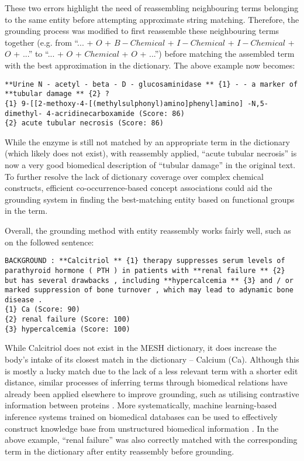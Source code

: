\documentclass[10pt, oneside]{article}
\begin{document}
These two errors highlight the need of reassembling neighbouring terms belonging to the same entity before attempting approximate string matching. Therefore, the grounding process was modified to first reassemble these neighbouring terms together (e.g. from ``... + $O$ + $B-Chemical$ + $I-Chemical$ + $I-Chemical$ +  $O$ + ...'' to ``... + $O$ + $Chemical$ +  $O$ + ...'') before matching the assembled term with the best approximation in the dictionary. The above example now becomes:

\begin{lstlisting}[breaklines]
**Urine N - acetyl - beta - D - glucosaminidase ** {1} - - a marker of **tubular damage ** {2} ? 
{1} 9-[[2-methoxy-4-[(methylsulphonyl)amino]phenyl]amino] -N,5-dimethyl- 4-acridinecarboxamide (Score: 86)
{2} acute tubular necrosis (Score: 86)
\end{lstlisting}

While the enzyme is still not matched by an appropriate term in the dictionary (which likely does not exist), with reassembly applied, ``acute tubular necrosis'' is now a very good biomedical description of ``tubular damage'' in the original text. To further resolve the lack of dictionary coverage over complex chemical constructs, efficient co-occurrence-based concept associations \cite{tsuruoka2008facta} could aid the grounding system in finding the best-matching entity based on functional groups in the term. 

Overall, the grounding method with entity reassembly works fairly well, such as on the followed sentence:

\begin{lstlisting}[breaklines]
BACKGROUND : **Calcitriol ** {1} therapy suppresses serum levels of parathyroid hormone ( PTH ) in patients with **renal failure ** {2} but has several drawbacks , including **hypercalcemia ** {3} and / or marked suppression of bone turnover , which may lead to adynamic bone disease . 
{1} Ca (Score: 90)
{2} renal failure (Score: 100)
{3} hypercalcemia (Score: 100)
\end{lstlisting}

While Calcitriol does not exist in the MESH dictionary, it does increase the body's intake of its closest match in the dictionary -- Calcium (Ca). Although this is mostly a lucky match due to the lack of a less relevant term with a shorter edit distance, similar processes of inferring terms through biomedical relations have already been applied elsewhere to improve grounding, such as utilising contrastive information between proteins \cite{kim2005biocontrasts}. More systematically, machine learning-based inference systems trained on biomedical databases can be used to effectively construct knowledge base from unstructured biomedical information \cite{shin2015incremental}. In the above example, ``renal failure'' was also correctly matched with the corresponding term in the dictionary after entity reassembly before grounding.
\end{document}
